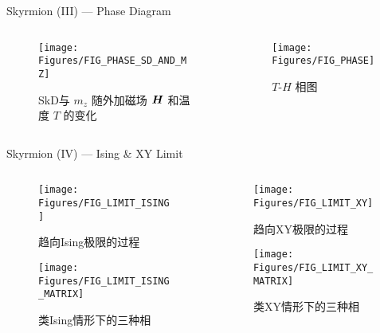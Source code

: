 \documentclass[UTF8, aspectratio = 43]{beamer}
\begin{document}
		\begin{frame}{Skyrmion (III) --- Phase Diagram}
			\begin{columns}
				\begin{column}{0.6\textwidth}
					\begin{figure}
						\texttt{[image: Figures/FIG\_PHASE\_SD\_AND\_MZ]}
						\caption{SkD与 $m_z$ 随外加磁场 $\bm{H}$ 和温度 $T$ 的变化}
					\end{figure}
				\end{column} \pause
				\begin{column}{0.4\textwidth}
					\begin{figure}
						\texttt{[image: Figures/FIG\_PHASE]}
						\caption{$T$-$H$ 相图}
					\end{figure}
				\end{column}
			\end{columns}
		\end{frame}
		
		\begin{frame}{Skyrmion (IV) --- Ising \& XY Limit}
			\begin{columns}
				\begin{column}{0.5\textwidth}
					\begin{figure}
						\texttt{[image: Figures/FIG\_LIMIT\_ISING]}
						\caption{趋向Ising极限的过程}
					\end{figure}
					\vspace{-1cm}
					\begin{figure}
						\texttt{[image: Figures/FIG\_LIMIT\_ISING\_MATRIX]}
						\caption{类Ising情形下的三种相}
					\end{figure}
				\end{column} \pause
				\begin{column}{0.5\textwidth}
					\begin{figure}
						\texttt{[image: Figures/FIG\_LIMIT\_XY]}
						\caption{趋向XY极限的过程}
					\end{figure}
					\vspace{-1cm}
					\begin{figure}
%						
						\texttt{[image: Figures/FIG\_LIMIT\_XY\_MATRIX]}
						\caption{类XY情形下的三种相}
					\end{figure}
				\end{column}
			\end{columns}
		\end{frame}
		
\end{document}
